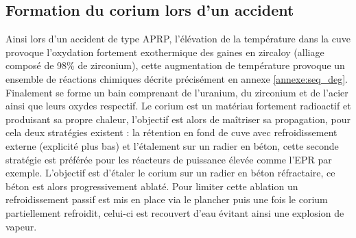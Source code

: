 \subsection{Formation du corium lors d'un accident}
Ainsi lors d'un accident de type APRP, l'élévation de la température dans la cuve provoque l'oxydation fortement exothermique des gaines en zircaloy (alliage composé de 98\% de zirconium), cette augmentation de température provoque un ensemble de réactions chimiques décrite précisément en annexe \ref{annexe:seq_deg}. Finalement se forme un bain comprenant de l'uranium, du zirconium et de l'acier ainsi que leurs oxydes respectif. Le corium est un matériau fortement radioactif et produisant sa propre chaleur, l'objectif est alors de maîtriser sa propagation, pour cela deux stratégies existent : la rétention en fond de cuve avec refroidissement externe (explicité plus bas) et l'étalement sur un radier en béton, cette seconde stratégie est préférée pour les réacteurs de puissance élevée comme l'EPR par exemple. L'objectif est d'étaler le corium sur un radier en béton réfractaire, ce béton est alors progressivement ablaté. Pour limiter cette ablation un refroidissement passif est mis en place via le plancher puis une fois le corium partiellement refroidit, celui-ci est recouvert d'eau évitant ainsi une explosion de vapeur.

